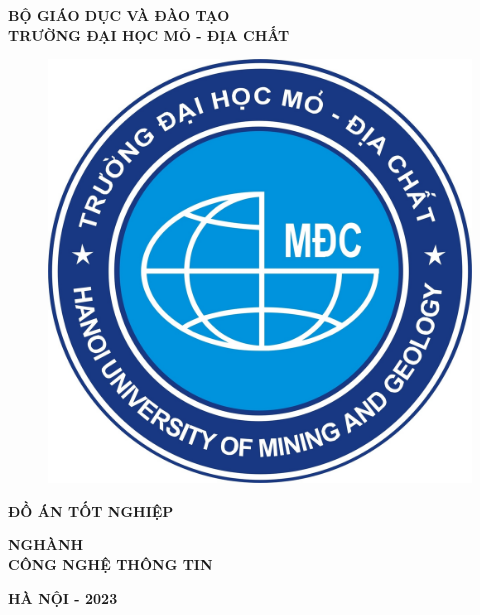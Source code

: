 \thispagestyle{empty}
\begin{center}
    \vspace{-6pt} \textbf{\fontsize{18pt}{0}\selectfont BỘ GIÁO DỤC VÀ ĐÀO TẠO} \\
    \vspace{1.5pt}\textbf{\fontsize{18pt}{0}\selectfont TRƯỜNG ĐẠI HỌC MỎ - ĐỊA CHẤT}

    \vspace{1.0cm}
    \begin{figure}[h]
        \includegraphics{images/Logo Truong Dai hoc Mo - Dia chat.jpg}
        \centering
    \end{figure}

    \vspace{1.0cm}
    \textbf{\fontsize{35pt}{0}\selectfont ĐỒ ÁN TỐT NGHIỆP} 

    \vspace{0.5cm}
    \textbf{\fontsize{18pt}{0}\selectfont NGHÀNH \\ \vspace{0.1cm} CÔNG NGHỆ THÔNG TIN} 

    \vspace{9.0cm}
    \textbf{\fontsize{18pt}{0}\selectfont HÀ NỘI - 2023}
\end{center}

